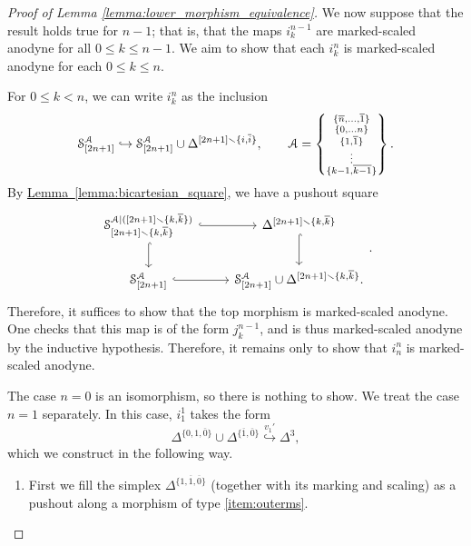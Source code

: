 \documentclass[main.tex]{subfiles}
\begin{document}
\begin{proof}[Proof of Lemma \ref{lemma:lower_morphism_equivalence}]
  We now suppose that the result holds true for $n-1$; that is, that the maps $i^{n-1}_{k}$ are marked-scaled anodyne for all $0 \leq k \leq n-1$. We aim to show that each $i^{n}_{k}$ is marked-scaled anodyne for each $0 \leq k \leq n$.

  For $0 \leq k < n$, we can write $i^{n}_{k}$ as the inclusion
  \begin{equation*}
    \S^{\mathcal{A}}_{[2n+1]} \hookrightarrow \S^{\mathcal{A}}_{[2n+1]} \cup \Delta^{[2n+1] \smallsetminus \{i, \overline{i}\}},\qquad \mathcal{A}
    = \left\{ \substack{ \{\overline{n}, \ldots, \overline{1}\} \\ \{0, \ldots n\} \\ \{1, \overline{1}\} \\ \vdots \\ \{k-1, \overline{k-1}\} } \right\}.
  \end{equation*}
  By \hyperref[lemma:bicartesian_square]{Lemma~\ref*{lemma:bicartesian_square}}, we have a pushout square
  \begin{equation*}
    \begin{tikzcd}
      \S^{\mathcal{A}|([2n+1] \smallsetminus \{k, \overline{k}\})}_{[2n+1] \smallsetminus \{k, \overline{k}\}}
      \arrow[r, hook]
      \arrow[d, hook]
      & \Delta^{[2n+1] \smallsetminus \{k, \overline{k}\}}
      \arrow[d, hook]
      \\
      \S^{\mathcal{A}}_{[2n+1]}
      \arrow[r, hook]
      & \S^{\mathcal{A}}_{[2n+1]} \cup \Delta^{[2n+1] \smallsetminus \{k, \overline{k}\}}.
    \end{tikzcd}.
  \end{equation*}
  Therefore, it suffices to show that the top morphism is marked-scaled anodyne. One checks that this map is of the form $j^{n-1}_{k}$, and is thus marked-scaled anodyne by the inductive hypothesis. Therefore, it remains only to show that $i^{n}_{n}$ is marked-scaled anodyne.

  The case $n = 0$ is an isomorphism, so there is nothing to show. We treat the case $n = 1$ separately. In this case, $i^{1}_{1}$ takes the form
  \begin{equation*}
    \Delta^{\{0,1,\overline{0}\}} \cup \Delta^{\{\overline{1},\overline{0}\}} \overset{v_{1}'}{\hookrightarrow} \Delta^{3},
  \end{equation*}
  which we construct in the following way.
  \begin{enumerate}
    \item First we fill the simplex $\Delta^{\{1,\overline{1},\overline{0}\}}$ (together with its marking and scaling) as a pushout along a morphism of type \ref{item:outerms}.


\end{enumerate}
\end{proof}
\end{document}
